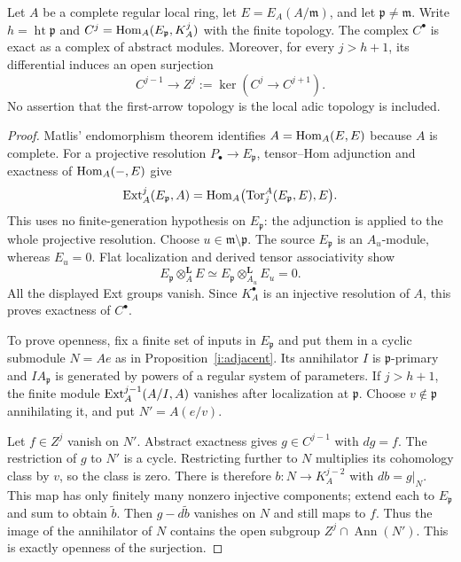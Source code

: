 \begin{proposition}
Let $A$ be a complete regular local ring, let
$E=E_A(A/\mathfrak m)$, and let $\mathfrak p\ne\mathfrak m$.
Write $h=\operatorname{ht}\mathfrak p$ and
$C^j=\operatorname{Hom}_A(E_{\mathfrak p},K_A^j)$ with the finite topology.
The complex $C^\bullet$ is exact as a complex of abstract modules.
Moreover, for every $j>h+1$, its differential induces an open
surjection
\[
 C^{j-1}\longrightarrow Z^j:=\ker(C^j\to C^{j+1}).
\]
No assertion that the first-arrow topology is the local adic
topology is included.
\end{proposition}
\begin{proof}
Matlis' endomorphism theorem identifies
$A=\operatorname{Hom}_A(E,E)$ because $A$ is complete. For a projective
resolution $P_\bullet\to E_{\mathfrak p}$, tensor--Hom adjunction
and exactness of $\operatorname{Hom}_A(-,E)$ give
\[
 \operatorname{Ext}_A^j(E_{\mathfrak p},A)
   =\operatorname{Hom}_A\bigl(\operatorname{Tor}_j^A(E_{\mathfrak p},E),E\bigr).
\]
This uses no finite-generation hypothesis on $E_{\mathfrak p}$:
the adjunction is applied to the whole projective resolution.
Choose $u\in\mathfrak m\setminus\mathfrak p$. The source
$E_{\mathfrak p}$ is an $A_u$-module, whereas $E_u=0$.
Flat localization and derived tensor associativity show
\[
 E_{\mathfrak p}\mathbin{\otimes}_A^{\mathbf L}E
  \simeq
 E_{\mathfrak p}\mathbin{\otimes}_{A_u}^{\mathbf L}E_u=0.
\]
All the displayed Ext groups vanish. Since $K_A^\bullet$ is an
injective resolution of $A$, this proves exactness of $C^\bullet$.

To prove openness, fix a finite set of inputs in $E_{\mathfrak p}$
and put them in a cyclic submodule $N=Ae$ as in
Proposition~\ref{i:adjacent}. Its annihilator $I$ is
$\mathfrak p$-primary and $I A_{\mathfrak p}$ is generated by
powers of a regular system of parameters. If $j>h+1$, the finite
module $\operatorname{Ext}_A^{j-1}(A/I,A)$ vanishes after localization at
$\mathfrak p$. Choose $v\notin\mathfrak p$ annihilating it, and
put $N'=A(e/v)$.

Let $f\in Z^j$ vanish on $N'$. Abstract exactness gives
$g\in C^{j-1}$ with $dg=f$. The restriction of $g$ to $N'$
is a cycle. Restricting further to $N$ multiplies its cohomology
class by $v$, so the class is zero. There is therefore
$b:N\to K_A^{j-2}$ with $db=g|_N$. This map has only finitely
many nonzero injective components; extend each to
$E_{\mathfrak p}$ and sum to obtain $\widetilde b$.
Then $g-d\widetilde b$ vanishes on $N$ and still maps to $f$.
Thus the image of the annihilator of $N$ contains the open
subgroup $Z^j\cap\operatorname{Ann}(N')$. This is exactly
openness of the surjection.
\end{proof}

